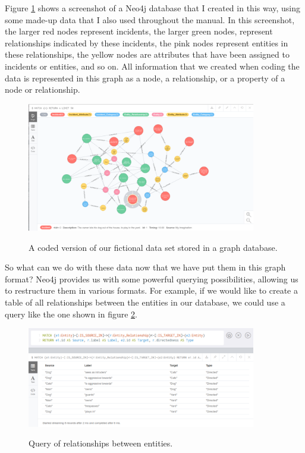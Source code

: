 \documentclass{memoir}
\begin{document}
Figure \ref{fig:graphdatabaseexample} shows a screenshot of a Neo4j database that I created in this way, using some made-up data that I also used throughout the manual. In this screenshot, the larger red nodes represent incidents, the larger green nodes, represent relationships indicated by these incidents, the pink nodes represent entities in these relationships, the yellow nodes are attributes that have been assigned to incidents or entities, and so on. All information that we created when coding the data is represented in this graph as a node, a relationship, or a property of a node or relationship.

\begin{figure}[h!]
  \centering
  \caption{A coded version of our fictional data set stored in a graph database.}
  \includegraphics[width=100mm]{Screenshot_23.pdf}
  \label{fig:graphdatabaseexample}
\end{figure}

So what can we do with these data now that we have put them in this graph format? Neo4j provides us with some powerful querying possibilities, allowing us to restructure them in various formats. For example, if we would like to create a table of all relationships between the entities in our database, we could use a query like the one shown in figure \ref{fig:entitiestable}.

\begin{figure}[h!]
  \centering
  \caption{Query of relationships between entities.}
  \includegraphics[width=100mm]{Screenshot_25.pdf}
  \label{fig:entitiestable}
\end{figure}
\end{document}
